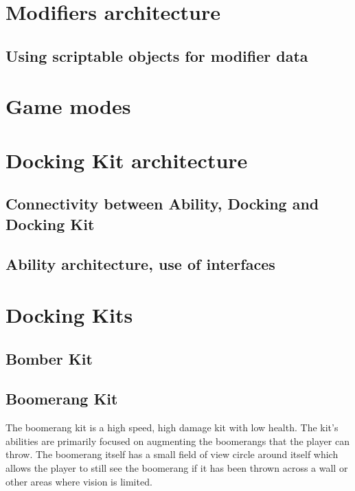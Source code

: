 \section{Modifiers architecture}
\subsection{Using scriptable objects for modifier data}

\section{Game modes}

\section{Docking Kit architecture}
\subsection{Connectivity between Ability, Docking and Docking Kit}
\subsection{Ability architecture, use of interfaces}

\section{Docking Kits}
\label{sec:dockingKits}
\subsection{Bomber Kit}
\subsection{Boomerang Kit}
The boomerang kit is a high speed, high damage kit with low health. The kit's abilities are primarily focused on augmenting the boomerangs that the player can throw. The boomerang itself has a small field of view circle around itself which allows the player to still see the boomerang if it has been thrown across a wall or other areas where vision is limited. 

